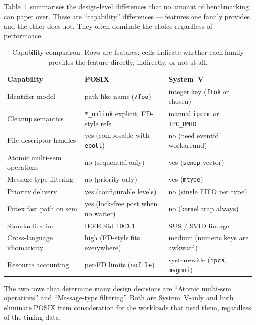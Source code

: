 \documentclass[a4paper,11pt]{article}
\begin{document}
Table~\ref{tab:capability} summarises the design-level differences
that no amount of benchmarking can paper over. These are
``capability'' differences --- features one family provides and the
other does not. They often dominate the choice regardless of
performance.

\begin{table}[H]
\centering
\caption{Capability comparison. Rows are features; cells indicate
whether each family provides the feature directly, indirectly, or
not at all.}
\label{tab:capability}
\small
\begin{tabular}{lll}
\toprule
\textbf{Capability} & \textbf{POSIX} & \textbf{System~V} \\
\midrule
Identifier model            & path-like name (\texttt{/foo})  & integer key (\texttt{ftok} or chosen) \\
Cleanup semantics           & \texttt{*\_unlink} explicit; FD-style refs & manual \texttt{ipcrm} or \texttt{IPC\_RMID} \\
File-descriptor handles     & yes (composable with \texttt{epoll})    & no (need eventfd workaround) \\
Atomic multi-sem operations & no (sequential only)                    & yes (\texttt{semop} vector) \\
Message-type filtering      & no (priority only)                      & yes (\texttt{mtype}) \\
Priority delivery           & yes (configurable levels)               & no (single FIFO per type) \\
Futex fast path on sem      & yes (lock-free post when no waiter)     & no (kernel trap always) \\
Standardisation             & IEEE Std 1003.1                         & SUS / SVID lineage \\
Cross-language idiomaticity & high (FD-style fits everywhere)         & medium (numeric keys are awkward) \\
Resource accounting         & per-FD limits (\texttt{nofile})         & system-wide (\texttt{ipcs}, \texttt{msgmni}) \\
\bottomrule
\end{tabular}
\end{table}

The two rows that determine many design decisions are
``Atomic multi-sem operations'' and ``Message-type filtering''.
Both are System~V-only and both eliminate POSIX from consideration
for the workloads that need them, regardless of the timing data.
\end{document}
